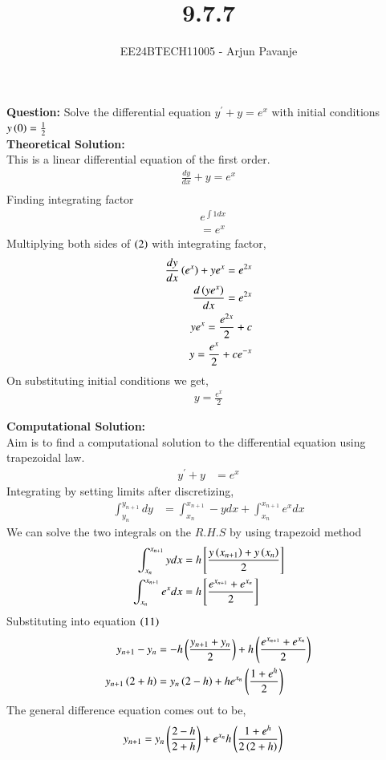 \documentclass[journal]{IEEEtran}
\begin{document}

\vspace{3cm}

\title{9.7.7}
\author{EE24BTECH11005 - Arjun Pavanje}
{\let\newpage\relax\maketitle}
\textbf{Question:}
Solve the differential equation $y^{\prime}+y=e^x$ with initial conditions $y\left(0\right)=\frac{1}{2}$
\solution\\
\textbf{Theoretical Solution:}\\
This is a linear differential equation of the first order.
\begin{align}
  \frac{dy}{dx} + y = e^x\\
\end{align}
Finding integrating factor 
\begin{align}
  &e^{\int 1dx}\\
  &=e^x
\end{align}
Multiplying both sides of $\left(2\right)$ with integrating factor,
\begin{align}
  \frac{dy}{dx}\left(e^x\right) + ye^x = e^{2x}\\
  \frac{d\left(ye^x\right)}{dx}=e^{2x}\\
  ye^x=\frac{e^{2x}}{2}+c\\
  y=\frac{e^x}{2}+ce^{-x}
\end{align}
On substituting initial conditions we get,
\begin{align}
  y=\frac{e^x}{2}
\end{align}

\textbf{Computational Solution:}\\
Aim is to find a computational solution to the differential equation using trapezoidal law.
\begin{align}
  y^{\prime}+y&=e^x
\end{align}
Integrating by setting limits after discretizing,
\begin{align}
  \int_{y_n}^{y_{n+1}}dy&=\int_{x_n}^{x_{n+1}}-y dx +\int_{x_n}^{x_{n+1}} e^x dx
\end{align}
We can solve the two integrals on the $R.H.S$ by using trapezoid method
\begin{align}
  \int_{x_n}^{x_{n+1}}ydx&= h{}\left[\frac{y\left(x_{n+1}\right)+y\left(x_n\right)}{2}\right]\\
  \int_{x_n}^{x_{n+1}}e^xdx&= h{}\left[\frac{e^{x_{n+1}}+e^{x_n} }{2}\right]
\end{align}
Substituting into equation $\left(11\right)$
\begin{align}
  y_{n+1}-y_{n}&=-h\left(\frac{y_{n+1}+y_{n}}{2}\right)+h\left(\frac{e^{x_{n+1}}+e^{x_n}}{2}\right)\\
  y_{n+1}\left(2+h\right)&=y_n\left(2-h\right)+he^{x_n}\left(\frac{1+e^h}{2}\right)
\end{align}
The general difference equation comes out to be,
\begin{align}
  y_{n+1}&=y_n\left(\frac{2-h}{2+h}\right)+e^{x_n}h\left(\frac{1+e^h}{2\left(2+h\right)}\right)
\end{align}
\end{document}
